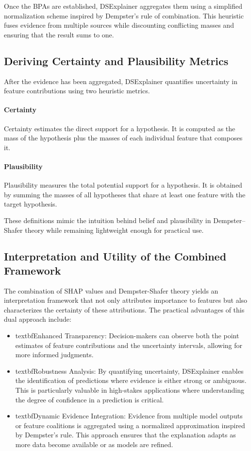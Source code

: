 \documentclass[acmlarge]{acmart}
\begin{document}
Once the BPAs are established, DSExplainer aggregates them using a simplified normalization scheme inspired by Dempster's rule of combination. This heuristic fuses evidence from multiple sources while discounting conflicting masses and ensuring that the result sums to one.

\subsection{Deriving Certainty and Plausibility Metrics}

After the evidence has been aggregated, DSExplainer quantifies uncertainty in feature contributions using two heuristic metrics.

\paragraph{Certainty}
Certainty estimates the direct support for a hypothesis. It is computed as the mass of the hypothesis plus the masses of each individual feature that composes it.

\paragraph{Plausibility}
Plausibility measures the total potential support for a hypothesis. It is obtained by summing the masses of all hypotheses that share at least one feature with the target hypothesis.

These definitions mimic the intuition behind belief and plausibility in Dempster--Shafer theory while remaining lightweight enough for practical use.


\subsection{Interpretation and Utility of the Combined Framework}

The combination of SHAP values and Dempster-Shafer theory yields an interpretation framework that not only attributes importance to features but also characterizes the certainty of these attributions. The practical advantages of this dual approach include:
\begin{itemize}
    \item textbf{Enhanced Transparency:}  
    Decision-makers can observe both the point estimates of feature contributions and the uncertainty intervals, allowing for more informed judgments.
    \item textbf{Robustness Analysis:}  
    By quantifying uncertainty, DSExplainer enables the identification of predictions where evidence is either strong or ambiguous. This is particularly valuable in high-stakes applications where understanding the degree of confidence in a prediction is critical.
    \item textbf{Dynamic Evidence Integration:}
    Evidence from multiple model outputs or feature coalitions is aggregated using a normalized approximation inspired by Dempster's rule. This approach ensures that the explanation adapts as more data become available or as models are refined.
\end{itemize}
\end{document}
